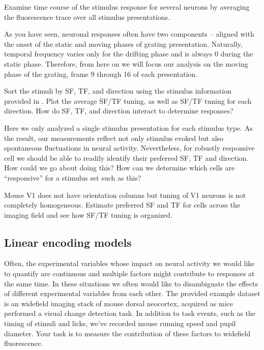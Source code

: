 \documentclass[a4paper]{report}
\newcommand{\nexercise}[0]{\arabic{exercises}\addtocounter{exercises}{1}}
\begin{document}
\begin{exercisebox}[frametitle={Exercise \nexercise: Mean response time course}]
Examine time course of the stimulus response for several neurons by averaging the fluorescence trace over all stimulus presentations.
\end{exercisebox}

As you have seen, neuronal responses often have two components -- aligned with the onset of the static and moving phases of grating presentation. 
Naturally, temporal frequency varies only for the drifting phase and is always 0 during the static phase.
Therefore, from here on we will focus our analysis on the moving phase of the grating, frame 9 through 16 of each presentation.

\begin{exercisebox}[frametitle={Exercise \nexercise: Spatial and temporal frequency tuning}]
Sort the stimuli by SF, TF, and direction using the stimulus information provided in \texttt{}. 
Plot the average SF/TF tuning, as well as SF/TF tuning for each direction. 
How do SF, TF, and direction interact to determine responses?
\end{exercisebox}

Here we only analyzed a single stimulus presentation for each stimulus type. 
As the result, our measurements reflect not only stimulus evoked but also spontaneous fluctuations in neural activity.
Nevertheless, for robustly responsive cell we should be able to readily identify their preferred SF, TF and direction. 
How could we go about doing this? 
How can we determine which cells are ``responsive'' for a stimulus set such as this?

\begin{exercisebox}[frametitle={Exercise \nexercise: Spatial distribution of tuning preferences in V1}]
Mouse V1 does not have orientation columns but tuning of V1 neurons is not completely homogeneous. 
Estimate preferred SF and TF for cells across the imaging field and see how SF/TF tuning is organized.
\end{exercisebox}

\subsection{Linear encoding models}
Often, the experimental variables whose impact on neural activity we would like to quantify are continuous and multiple factors might contribute to responses at the same time. 
In these situations we often would like to disambiguate the effects of different experimental variables from each other. 
The provided example dataset is an widefield imaging stack of mouse dorsal neocortex, acquired as mice performed a visual change detection task.
In addition to task events, such as the timing of stimuli and licks, we've recorded mouse running speed and pupil diameter. 
Your task is to measure the contribution of these factors to widefield fluorescence.
\end{document}
